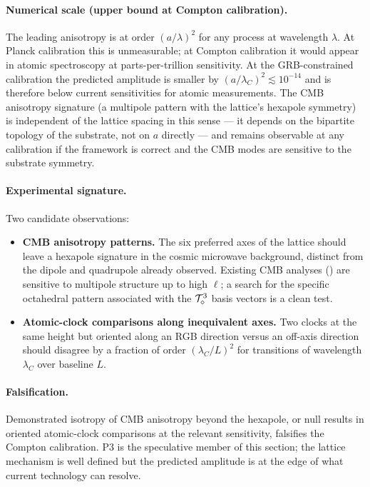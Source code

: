 \paragraph{Numerical scale (upper bound at Compton calibration).}
The leading anisotropy is at order $(a/\lambda)^2$ for any
process at wavelength $\lambda$. At Planck calibration this is
unmeasurable; at Compton calibration it would appear in atomic
spectroscopy at parts-per-trillion sensitivity.
At the GRB-constrained calibration the predicted amplitude is
smaller by $(a/\lambda_C)^2 \lesssim 10^{-14}$ and is therefore
below current sensitivities for atomic measurements.
The CMB anisotropy signature (a multipole pattern with the lattice's
hexapole symmetry) is independent of the lattice spacing in this
sense --- it depends on the bipartite topology of the substrate, not
on $a$ directly --- and remains observable at any calibration if
the framework is correct and the CMB modes are sensitive to the
substrate symmetry.

\paragraph{Experimental signature.}
Two candidate observations:

\begin{itemize}
    \item \textbf{CMB anisotropy patterns.} The six preferred axes
    of the lattice should leave a hexapole signature in the
    cosmic microwave background, distinct from the dipole and
    quadrupole already observed. Existing CMB analyses
    (\cite{planck2020}) are sensitive to multipole structure up to
    high $\ell$; a search for the specific octahedral pattern
    associated with the $\mathcal{T}_\diamond^3$ basis vectors is a clean test.
    \item \textbf{Atomic-clock comparisons along inequivalent axes.}
    Two clocks at the same height but oriented along an RGB
    direction versus an off-axis direction should disagree by a
    fraction of order $(\lambda_C/L)^2$ for transitions of
    wavelength $\lambda_C$ over baseline $L$.
\end{itemize}

\paragraph{Falsification.}
Demonstrated isotropy of CMB anisotropy beyond the hexapole, or null
results in oriented atomic-clock comparisons at the relevant
sensitivity, falsifies the Compton calibration. P3 is the
speculative member of this section; the lattice mechanism is well
defined but the predicted amplitude is at the edge of what current
technology can resolve.

